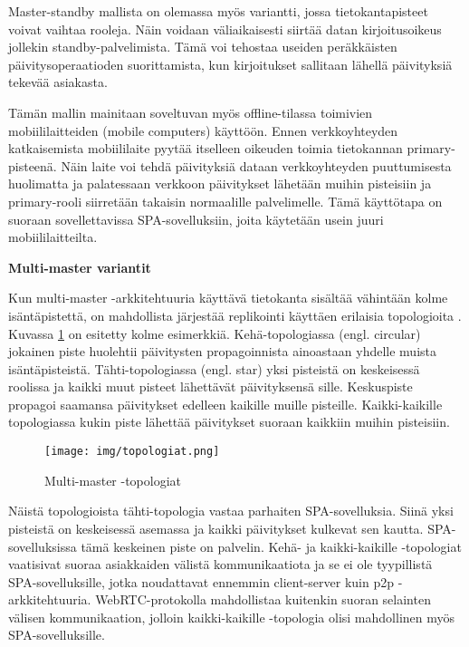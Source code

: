 \documentclass[finnish,twoside,censored,csm,sw-track-2018]{HYthesisML}
\begin{document}
Master-standby mallista on olemassa \citep{70ties, Tanenbaum} myös variantti, jossa tietokantapisteet voivat vaihtaa rooleja. Näin voidaan väliaikaisesti siirtää datan kirjoitusoikeus jollekin standby-palvelimista. Tämä voi tehostaa useiden peräkkäisten päivitysoperaatioden suorittamista, kun kirjoitukset sallitaan lähellä päivityksiä tekevää asiakasta.

Tämän mallin mainitaan soveltuvan myös offline-tilassa toimivien mobiililaitteiden (mobile computers) käyttöön. Ennen verkkoyhteyden katkaisemista mobiililaite pyytää itselleen oikeuden toimia tietokannan primary-pisteenä. Näin laite voi tehdä päivityksiä dataan verkkoyhteyden puuttumisesta huolimatta ja palatessaan verkkoon päivitykset lähetään muihin pisteisiin ja primary-rooli siirretään takaisin normaalille palvelimelle. Tämä käyttötapa on suoraan sovellettavissa SPA-sovelluksiin, joita käytetään usein juuri mobiililaitteilta.

\textbf{Multi-master variantit}

Kun multi-master -arkkitehtuuria käyttävä tietokanta sisältää vähintään kolme isäntäpistettä, on mahdollista järjestää replikointi käyttäen erilaisia topologioita \citep{Kleppmann}. Kuvassa \ref{fig-multimaster-topologiat} on esitetty kolme esimerkkiä. Kehä-topologiassa (engl. circular) jokainen piste huolehtii päivitysten propagoinnista ainoastaan yhdelle muista isäntäpisteistä. Tähti-topologiassa (engl. star) yksi pisteistä on keskeisessä roolissa ja kaikki muut pisteet lähettävät päivityksensä sille. Keskuspiste propagoi saamansa päivitykset edelleen kaikille muille pisteille. Kaikki-kaikille topologiassa kukin piste lähettää päivitykset suoraan kaikkiin muihin pisteisiin.

\begin{figure}[ht]
  \centering
    \texttt{[image: img/topologiat.png]}
  \caption{Multi-master -topologiat}
  \label{fig-multimaster-topologiat}
\end{figure}

Näistä topologioista tähti-topologia vastaa parhaiten SPA-sovelluksia. Siinä yksi pisteistä on keskeisessä asemassa ja kaikki päivitykset kulkevat sen kautta. SPA-sovelluksissa tämä keskeinen piste on palvelin. Kehä- ja kaikki-kaikille -topologiat vaatisivat suoraa asiakkaiden välistä kommunikaatiota ja se ei ole tyypillistä SPA-sovelluksille, jotka noudattavat ennemmin client-server kuin p2p -arkkitehtuuria. WebRTC-protokolla mahdollistaa kuitenkin suoran selainten välisen kommunikaation, jolloin kaikki-kaikille -topologia olisi mahdollinen myös SPA-sovelluksille.
\end{document}
